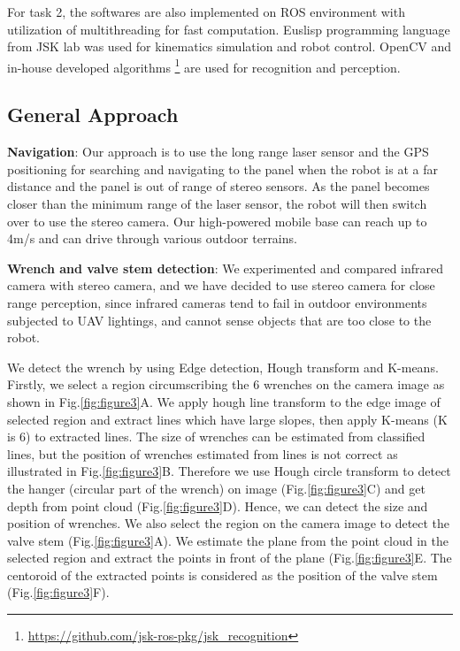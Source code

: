 \documentclass{standalone}
\begin{document}
For task 2, the softwares are also implemented on ROS environment with utilization of multithreading for fast computation. Euslisp programming language from JSK lab was used for kinematics simulation and robot control. OpenCV and in-house developed algorithms
 \footnote{\url{https://github.com/jsk-ros-pkg/jsk_recognition}} are used for recognition and perception.

 \subsection{General Approach}
 \textbf{Navigation}: Our approach is to use the long range laser sensor and the GPS positioning for searching and navigating to the panel when the robot is at a far distance and the panel is out of range of stereo sensors.  %
As the panel becomes closer than the minimum range of the laser sensor, the robot will then switch over to use the stereo camera. Our high-powered mobile base can reach up to 4m/s and can drive through various outdoor terrains. 

\textbf{Wrench and valve stem detection}: We experimented and compared infrared camera with stereo camera, and we have decided to use stereo camera for close range perception, since infrared cameras tend to fail in outdoor environments subjected to UAV lightings, and cannot sense objects that are too close to the robot. 

We detect the wrench by using Edge detection, Hough transform and K-means. Firstly, we select a region circumscribing the 6 wrenches on the camera image as shown in Fig.\ref{fig:figure3}A. We apply hough line transform to the edge image of selected region and extract lines which have large slopes, then apply K-means (K is 6) to extracted lines. The size of wrenches can be estimated from classified lines, but the position of wrenches estimated from lines is not correct as illustrated in Fig.\ref{fig:figure3}B. Therefore we use Hough circle transform to detect the hanger (circular part of the wrench) on image (Fig.\ref{fig:figure3}C) and get depth from point cloud (Fig.\ref{fig:figure3}D). Hence, we can detect the size and position of wrenches. We also select the region on the camera image to detect the valve stem (Fig.\ref{fig:figure3}A). We estimate the plane from the point cloud in the selected region and extract the points in front of the plane (Fig.\ref{fig:figure3}E. The centoroid of the extracted points is considered as the position of the valve stem (Fig.\ref{fig:figure3}F).
\end{document}
